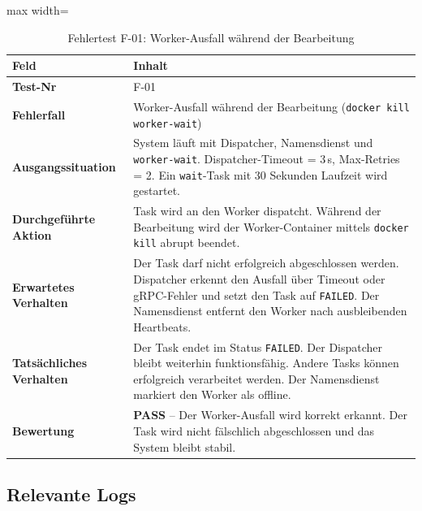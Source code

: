 \documentclass[a4paper,12pt]{article}
\begin{document}
\begin{table}[H]
    \centering
    \begin{adjustbox}{max width=\textwidth}
    \begin{tabular}{>{\bfseries}p{4.5cm} p{10cm}}
        \toprule
        Feld & Inhalt \\
        \midrule
        Test-Nr              & F-01 \\
        Fehlerfall           & Worker-Ausfall während der Bearbeitung (\texttt{docker kill worker-wait}) \\
        Ausgangssituation    & System läuft mit Dispatcher, Namensdienst und \texttt{worker-wait}.
                               Dispatcher-Timeout = 3\,s, Max-Retries = 2.
                               Ein \texttt{wait}-Task mit 30 Sekunden Laufzeit wird gestartet. \\
        Durchgeführte Aktion & Task wird an den Worker dispatcht.
                               Während der Bearbeitung wird der Worker-Container mittels
                               \texttt{docker kill} abrupt beendet. \\
        Erwartetes Verhalten & Der Task darf nicht erfolgreich abgeschlossen werden.
                               Dispatcher erkennt den Ausfall über Timeout oder gRPC-Fehler und setzt den
                               Task auf \texttt{FAILED}. Der Namensdienst entfernt den Worker nach
                               ausbleibenden Heartbeats. \\
        Tatsächliches Verhalten & Der Task endet im Status \texttt{FAILED}.
                               Der Dispatcher bleibt weiterhin funktionsfähig.
                               Andere Tasks können erfolgreich verarbeitet werden.
                               Der Namensdienst markiert den Worker als offline. \\
        Bewertung            & \textbf{PASS} -- Der Worker-Ausfall wird korrekt erkannt.
                               Der Task wird nicht fälschlich abgeschlossen und das System bleibt stabil. \\
        \bottomrule
    \end{tabular}
    \end{adjustbox}
    \caption{Fehlertest F-01: Worker-Ausfall während der Bearbeitung}
\end{table}

\subsection*{Relevante Logs}
\end{document}
